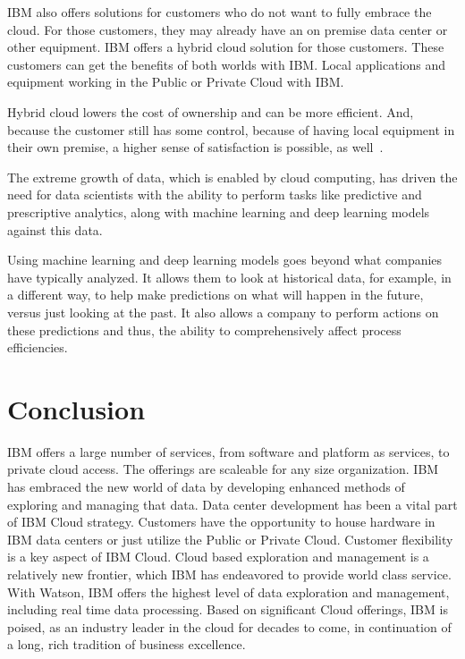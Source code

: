 IBM also offers solutions for customers who do not want to fully
embrace the cloud. For those customers, they may already have an on
premise data center or other equipment. IBM offers a hybrid cloud
solution for those customers. These customers can get the benefits of
both worlds with IBM. Local applications and equipment working in the
Public or Private Cloud with IBM.

Hybrid cloud lowers the cost of ownership and can be more efficient.
And, because the customer still has some control, because of having
local equipment in their own premise, a higher sense of satisfaction
is possible, as well~\cite{hid-sp18-525-hybrid}.

The extreme growth of data, which is enabled by cloud computing, has
driven the need for data scientists with the ability to perform tasks
like predictive and prescriptive analytics, along with machine
learning and deep learning models against this data.

Using machine learning and deep learning models goes beyond what
companies have typically analyzed. It allows them to look at
historical data, for example, in a different way, to help make
predictions on what will happen in the future, versus just looking at
the past. It also allows a company to perform actions on these
predictions and thus, the ability to comprehensively affect process
efficiencies.
 
 \section{Conclusion}

 IBM offers a large number of services, from software and platform as
 services, to private cloud access. The offerings are scaleable for
 any size organization. IBM has embraced the new world of data by
 developing enhanced methods of exploring and managing that data. Data
 center development has been a vital part of IBM Cloud strategy.
 Customers have the opportunity to house hardware in IBM data centers
 or just utilize the Public or Private Cloud. Customer flexibility is
 a key aspect of IBM Cloud. Cloud based exploration and management is
 a relatively new frontier, which IBM has endeavored to provide world
 class service. With Watson, IBM offers the highest level of data
 exploration and management, including real time data processing.
 Based on significant Cloud offerings, IBM is poised, as an industry
 leader in the cloud for decades to come, in continuation of a long,
 rich tradition of business excellence.
 
 



